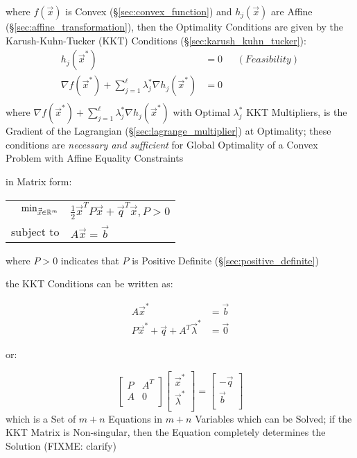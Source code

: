 where $f(\vec{x})$ is Convex (\S\ref{sec:convex_function}) and $h_j(\vec{x})$
are Affine (\S\ref{sec:affine_transformation}),
then the Optimality Conditions are given by the Karush-Kuhn-Tucker (KKT)
Conditions (\S\ref{sec:karush_kuhn_tucker}):
\begin{align*}
  h_j(\vec{x}^*) & = 0 & \ \ \ (Feasibility) \\
  \nabla f(\vec{x}^*) +
    \sum_{j=1}^\ell \lambda_j^* \nabla h_j(\vec{x}^*) & = 0 & \\
\end{align*}
where $\nabla f(\vec{x}^*) + \sum_{j=1}^\ell \lambda^*_j \nabla h_j(\vec{x}^*)$
with Optimal $\lambda^*_j$ KKT Multipliers, is the Gradient of the Lagrangian
(\S\ref{sec:lagrange_multiplier}) at Optimality;
these conditions are \emph{necessary and sufficient} for Global Optimality of a
Convex Problem with Affine Equality Constraints

in Matrix form:

\begin{tabular}{r l}
  $\mathrm{min}_{\vec{\vec{x}} \in \mathbb{R}^m}$ &
    $\frac{1}{2}\vec{x}^T P\vec{x} + \vec{q}^T\vec{x}, P > 0$ \\
  subject to & $A\vec{x} = \vec{b}$ \\
\end{tabular}

where $P > 0$ indicates that $P$ is Positive Definite
(\S\ref{sec:positive_definite})

the KKT Conditions can be written as:

\begin{align*}
  A\vec{x}^*                                & = \vec{b} \\
  P\vec{x}^* + \vec{q} + A^T\vec{\lambda}^* & = \vec{0}
\end{align*}

or:

\[
  \begin{bmatrix}
    P & A^T \\
    A & 0   \\
  \end{bmatrix}
  \begin{bmatrix}
    \vec{x}^*       \\
    \vec{\lambda}^* \\
  \end{bmatrix}
  =
  \begin{bmatrix}
    -\vec{q} \\
    \vec{b}  \\
  \end{bmatrix}
\]
which is a Set of $m + n$ Equations in $m + n$ Variables which can be Solved;
if the KKT Matrix is Non-singular, then the Equation completely determines the
Solution (FIXME: clarify)


